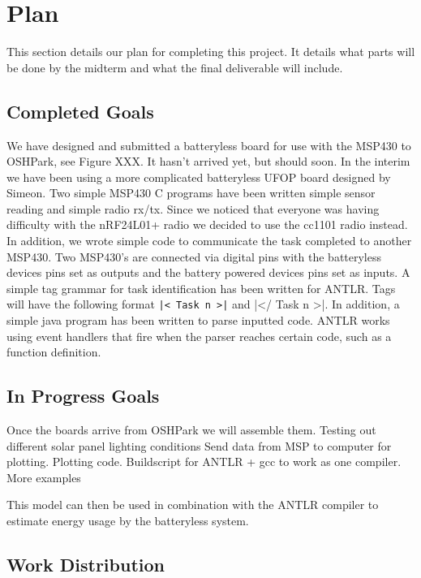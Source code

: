 \section{Plan} %
\label{sec:plan}

This section details our plan for completing this project. It details what parts will be done by the midterm and what the final deliverable will include.

\subsection{Completed Goals}

We have designed and submitted a batteryless board for use with the MSP430 to OSHPark, see Figure XXX.
It hasn't arrived yet, but should soon.
In the interim we have been using a more complicated batteryless UFOP board designed by Simeon.
Two simple MSP430 C programs have been written simple sensor reading and simple radio rx/tx.
Since we noticed that everyone was having difficulty with the nRF24L01+ radio we decided to use the cc1101 radio instead.
In addition, we wrote simple code to communicate the task completed to another MSP430.
Two MSP430's are connected via digital pins with the batteryless devices pins set as outputs and the battery powered devices pins set as inputs.
A simple tag grammar for task identification has been written for ANTLR.
Tags will have the following format {\tt |< Task n >|} and |</ Task n >|.
In addition, a simple java program has been written to parse inputted code.
ANTLR works using event handlers that fire when the parser reaches certain code, such as a function definition.

\subsection{In Progress Goals}

Once the boards arrive from OSHPark we will assemble them.
Testing out different solar panel lighting conditions
Send data from MSP to computer for plotting.
Plotting code.
Buildscript for ANTLR + gcc to work as one compiler.
More examples

This model can then be used in combination with the ANTLR compiler to estimate energy usage by the batteryless system.

\subsection{Work Distribution}

